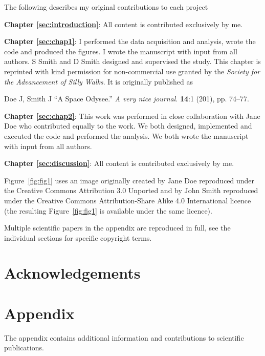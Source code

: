 \documentclass[pdftex, a4paper, oneside, 12pt, bibtotoc, idxtotoc ]{scrreprt}
\newcommand*\cleartorightpage{%
  \clearpage
  \ifodd\value{page}
  \else
    \newpage\thispagestyle{empty} \mbox{}
  \fi
}
\begin{document}
The following describes my original contributions to each project

\textbf{Chapter \ref{sec:introduction}}: All content is contributed exclusively
by me.

\textbf{Chapter \ref{sec:chap1}}: I performed the data
acquisition and analysis, wrote the code and produced the figures. I wrote the manuscript with
input from all authors.  S Smith and D Smith designed and supervised the study.
%
This chapter is reprinted with kind permission for non-commercial use
granted by the \textit{Society for the Advancement of Silly Walks}.
It is originally published as 

Doe J, Smith J
``A Space Odysee.''
\textit{A very nice journal}. \textbf{14}:1 (201), pp. 74–77.

\textbf{Chapter \ref{sec:chap2}}: This work was performed in close
collaboration with Jane Doe who contributed equally to the work. We
both designed, implemented and executed the code and performed the analysis.
We both wrote the manuscript with input from all authors.

\textbf{Chapter \ref{sec:discussion}}: All content
is contributed exclusively by me.

Figure~\ref{fig:fig1} uses an image originally created by Jane Doe
reproduced under the Creative Commons Attribution 3.0 Unported and by John Smith
reproduced under the Creative Commons Attribution-Share Alike 4.0
International licence (the resulting Figure~\ref{fig:fig1} is
available under the same licence).

Multiple scientific papers in the appendix are reproduced in full, see the
individual sections for specific copyright terms.

\cleartorightpage
\chapter{Acknowledgements}
\blindtext[2]

\cleartorightpage
\chapter{Appendix}

The appendix contains additional information and contributions to scientific
publications.

\clearpage
\end{document}
